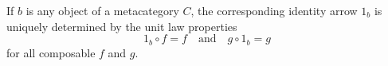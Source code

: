 If $b$ is any object of a metacategory $C$, the corresponding identity arrow $1_b$ is uniquely determined by the unit law properties
$$1_b \circ f = f \quad \text{and} \quad g \circ 1_b = g$$
for all composable $f$ and $g$.
